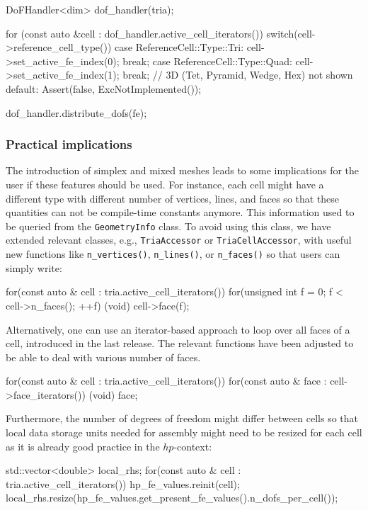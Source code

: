 \documentclass{ansarticle-preprint}
\begin{document}
\begin{c++}
DoFHandler<dim> dof_handler(tria);

for (const auto &cell : dof_handler.active_cell_iterators())
  switch(cell->reference_cell_type())
    {
      case ReferenceCell::Type::Tri:  cell->set_active_fe_index(0); break;
      case ReferenceCell::Type::Quad: cell->set_active_fe_index(1); break;
      // 3D (Tet, Pyramid, Wedge, Hex) not shown
      default: Assert(false, ExcNotImplemented());
    }

dof_handler.distribute_dofs(fe);
\end{c++}

\subsubsection{Practical implications}

The introduction of simplex and mixed meshes leads to some implications
for the user if these features should be used. For instance, each cell might have a different type with
different number of vertices, lines, and faces so that these quantities can not be
compile-time constants anymore. This information used to be queried from
the \texttt{GeometryInfo} class. To avoid using this class, we have extended
relevant classes, e.g., \texttt{TriaAccessor} or \texttt{TriaCellAccessor},
with useful new functions like \texttt{n\_vertices()}, \texttt{n\_lines()}, or
\texttt{n\_faces()} so that users can simply write:
\begin{c++}
for(const auto & cell : tria.active_cell_iterators())
  for(unsigned int f = 0; f < cell->n_faces(); ++f)
    (void) cell->face(f);
\end{c++}
Alternatively, one can use an iterator-based approach to loop over all faces
of a cell, introduced in the last release. The relevant functions have been adjusted to be able to deal with
various number of faces.
\begin{c++}
for(const auto & cell : tria.active_cell_iterators())
  for(const auto & face : cell->face_iterators())
    (void) face;
\end{c++}
Furthermore, the number of degrees of freedom might differ between cells so that
local data storage units needed for assembly might need to be resized for each
cell as it is already good practice in the $hp$-context:
\begin{c++}
std::vector<double> local_rhs;
for(const auto & cell : tria.active_cell_iterators())
 {
   hp_fe_values.reinit(cell);
   local_rhs.resize(hp_fe_values.get_present_fe_values().n_dofs_per_cell());
 }
\end{c++}
\end{document}
